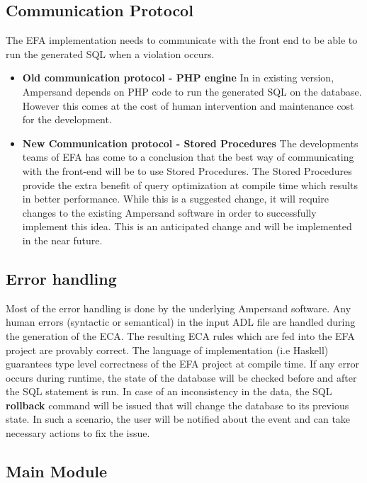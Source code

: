 \documentclass[12pt]{article}
\begin{document}
\subsection{Communication Protocol}
The EFA implementation needs to communicate with the front end to be able to run the generated SQL when a violation occurs. 
	\begin{itemize}
		\item \textbf{Old communication protocol -  PHP engine} \newline
			In in existing version, Ampersand depends on PHP code to run the generated SQL on the database. However this comes at the cost of human intervention and maintenance cost for the development. 
		\item \textbf{New Communication protocol - Stored Procedures} \newline
			The developments teams of EFA has come to a conclusion that the best way of communicating with the front-end will be to use Stored Procedures\cite{SP}. The Stored Procedures provide the extra benefit of query optimization at compile time which results in better performance. While this is a suggested change, it will require changes to the existing Ampersand software in order to successfully implement this idea. This is an anticipated change and will be implemented in the near future.
			
	\end{itemize}

\subsection{Error handling}
Most of the error handling is done by the underlying Ampersand software. Any human errors (syntactic or semantical) in the input ADL file are handled during the generation of the ECA. The resulting ECA rules which are fed into the EFA project are provably correct. The language of implementation (i.e Haskell) guarantees type level correctness of the EFA project at compile time. 
\newline
If any error occurs during runtime, the state of the database will be checked before and after the SQL statement is run. In case of an inconsistency in the data, the SQL \textbf{rollback} command will be issued that will change the database to its previous state. In such a scenario, the user will be notified about the event and can take necessary actions to fix the issue. 

\subsection{Main Module}
\end{document}
